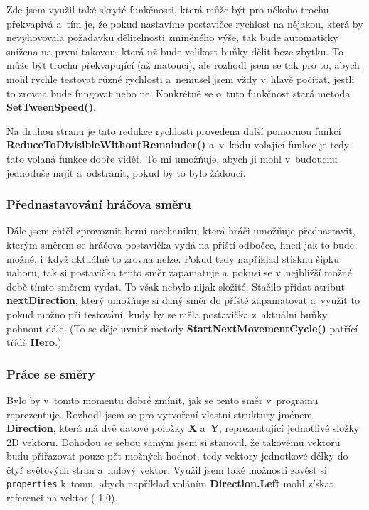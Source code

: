\documentclass[a4]{article}
\begin{document}
Zde jsem využil také skryté funkčnosti, která může být pro někoho trochu překvapivá a~tím je, že pokud nastavíme postavičce rychlost na nějakou, která by nevyhovovala požadavku dělitelnosti zmíněného výše, tak bude automaticky snížena na první takovou, která už bude velikost buňky dělit beze zbytku. To může být trochu překvapující (až matoucí), ale rozhodl jsem se tak pro to, abych mohl rychle testovat různé rychlosti a~nemusel jsem vždy v~hlavě počítat, jestli to zrovna bude fungovat nebo ne. Konkrétně se o~tuto funkčnost stará metoda \textbf{SetTweenSpeed()}. 

Na druhou stranu je tato redukce rychlosti provedena další pomocnou funkcí \textbf{ReduceToDivisibleWithoutRemainder()} a~v~kódu volající funkce je tedy tato volaná funkce dobře vidět. To mi umožňuje, abych ji mohl v~budoucnu jednoduše najít a~odstranit, pokud by to bylo žádoucí.

\subsubsection{Přednastavování hráčova směru}
Dále jsem chtěl zprovoznit herní mechaniku, která hráči umožňuje přednastavit, kterým směrem se hráčova postavička vydá na příští odbočce, hned jak to bude možné, i~když aktuálně to zrovna nelze. Pokud tedy například stisknu šipku nahoru, tak si postavička tento směr zapamatuje a~pokusí se v~nejbližší možné době tímto směrem vydat. To však nebylo nijak složité. Stačilo přidat atribut \textbf{nextDirection}, který umožňuje si daný směr do příště zapamatovat a~využít to pokud možno při testování, kudy by se měla postavička z~aktuální buňky pohnout dále. (To se děje uvnitř metody \textbf{StartNextMovementCycle()} patřící třídě \textbf{Hero}.)

\subsubsection{Práce se směry} \label{directions}
Bylo by v~tomto momentu dobré zmínit, jak se tento směr v~programu reprezentuje. Rozhodl jsem se pro vytvoření vlastní struktury jménem \textbf{Direction}, která má dvě datové položky \textbf{X} a~\textbf{Y}, reprezentující jednotlivé složky 2D vektoru. Dohodou se sebou samým jsem si stanovil, že takovému vektoru budu přiřazovat pouze pět možných hodnot, tedy vektory jednotkové délky do čtyř světových stran a~nulový vektor. Využil jsem také možnosti zavést si \verb|properties| k~tomu, abych například voláním \textbf{Direction.Left} mohl získat referenci na vektor (-1,0).
\end{document}

